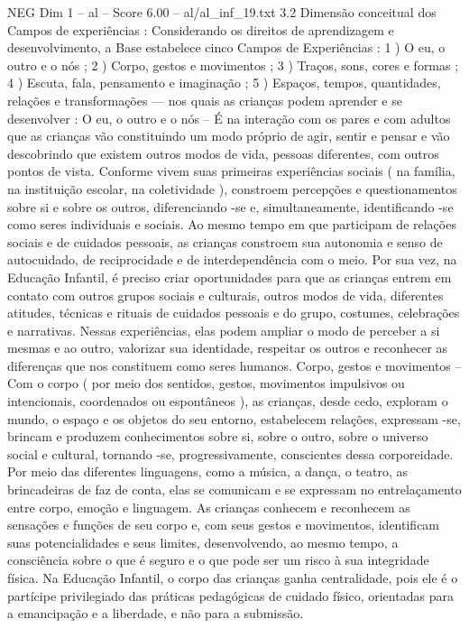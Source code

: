 \begin{textsample}{NEG Dim 1 – al – Score 6.00 – al/al\_inf\_19.txt}  \label{ex:f1_neg_140}
3.2 Dimensão conceitual dos Campos de experiências : Considerando os direitos de aprendizagem e desenvolvimento, a Base estabelece cinco Campos de Experiências : 1 ) O eu, o outro e o nós ; 2 ) Corpo, gestos e movimentos ; 3 ) Traços, sons, cores e formas ; 4 ) Escuta, fala, pensamento e imaginação ; 5 ) Espaços, tempos, quantidades, relações e transformações — nos quais as crianças podem aprender e se desenvolver : O eu, o outro e o nós – É na interação com os pares e com adultos que as crianças vão constituindo um modo próprio de agir, sentir e pensar e vão descobrindo que existem outros modos de vida, pessoas diferentes, com outros pontos de vista.
Conforme vivem suas primeiras experiências sociais ( na família, na instituição escolar, na coletividade ), constroem percepções e questionamentos sobre si e sobre os outros, diferenciando -se e, simultaneamente, identificando -se como seres individuais e sociais.
Ao mesmo tempo em que participam de relações sociais e de cuidados pessoais, as crianças constroem sua autonomia e senso de autocuidado, de reciprocidade e de interdependência com o meio.
Por sua vez, na Educação Infantil, é preciso criar oportunidades para que as crianças entrem em contato com outros grupos sociais e culturais, outros modos de vida, diferentes atitudes, técnicas e rituais de cuidados pessoais e do grupo, costumes, celebrações e narrativas.
Nessas experiências, elas podem ampliar o modo de perceber a si mesmas e ao outro, valorizar sua identidade, respeitar os outros e reconhecer as diferenças que nos constituem como seres humanos.
Corpo, gestos e movimentos – Com o corpo ( por meio dos sentidos, gestos, movimentos impulsivos ou intencionais, coordenados ou espontâneos ), as crianças, desde cedo, exploram o mundo, o espaço e os objetos do seu entorno, estabelecem relações, expressam -se, brincam e produzem conhecimentos sobre si, sobre o outro, sobre o universo social e cultural, tornando -se, progressivamente, conscientes dessa corporeidade.
Por meio das diferentes linguagens, como a música, a dança, o teatro, as brincadeiras de faz de conta, elas se comunicam e se expressam no entrelaçamento entre corpo, emoção e linguagem.
As crianças conhecem e reconhecem as sensações e funções de seu corpo e, com seus gestos e movimentos, identificam suas potencialidades e seus limites, desenvolvendo, ao mesmo tempo, a consciência sobre o que é seguro e o que pode ser um risco à sua integridade física.
Na Educação Infantil, o corpo das crianças ganha centralidade, pois ele é o partícipe privilegiado das práticas pedagógicas de cuidado físico, orientadas para a emancipação e a liberdade, e não para a submissão.

\end{textsample}
